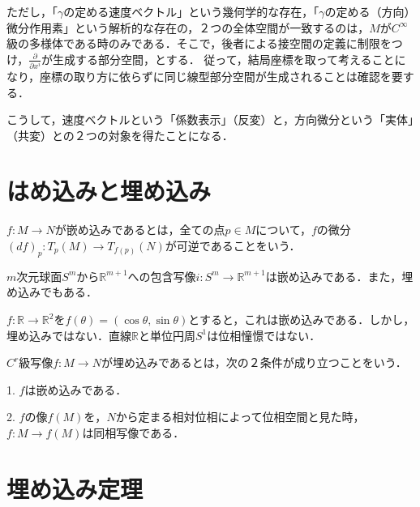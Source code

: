 \documentclass[uplatex, dvipdfmx]{jsreport}
\begin{document}
ただし，「$\gamma$の定める速度ベクトル」という幾何学的な存在，「$\gamma$の定める（方向）微分作用素」という解析的な存在の，２つの全体空間が一致するのは，$M$が$C^\infty$級の多様体である時のみである．そこで，後者による接空間の定義に制限をつけ，$\frac{\partial}{\partial x^i}$が生成する部分空間，とする．
従って，結局座標を取って考えることになり，座標の取り方に依らずに同じ線型部分空間が生成されることは確認を要する．

こうして，速度ベクトルという「係数表示」（反変）と，方向微分という「実体」（共変）との２つの対象を得たことになる．

\chapter{はめ込みと埋め込み}

\begin{definition}[immersion]
    $f:M\to N$が嵌め込みであるとは，全ての点$p\in M$について，$f$の微分$(df)_p:T_p(M)\to T_{f(p)}(N)$が可逆であることをいう．
\end{definition}
\begin{example}
    $m$次元球面$S^m$から$\mathbb{R}^{m+1}$への包含写像$i:S^m\to\mathbb{R}^{m+1}$は嵌め込みである．また，埋め込みでもある．
\end{example}

\begin{example}
    $f:\mathbb{R}\to\mathbb{R}^2$を$f(\theta)=(\cos\theta,\sin\theta)$とすると，これは嵌め込みである．しかし，埋め込みではない．直線$\mathbb{R}$と単位円周$S^1$は位相憧憬ではない．
\end{example}

\begin{definition}
    $C^r$級写像$f:M\to N$が埋め込みであるとは，次の２条件が成り立つことをいう．

    1. $f$は嵌め込みである．

    2. $f$の像$f(M)$を，$N$から定まる相対位相によって位相空間と見た時，$f:M\to f(M)$は同相写像である．
\end{definition}

\chapter{埋め込み定理}
\end{document}
